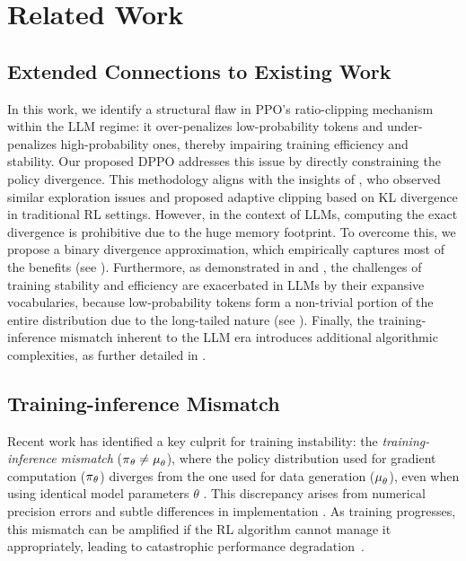 \section{Related Work}
\label{app:related_work}

\subsection{Extended Connections to Existing Work} \label{app:related_work_ratio_clipping}

In this work, we identify a structural flaw in PPO's ratio-clipping mechanism within the LLM regime: it over-penalizes low-probability tokens and under-penalizes high-probability ones, thereby impairing training efficiency and stability. Our proposed DPPO addresses this issue by directly constraining the policy divergence. 
This methodology aligns with the insights of \citet{wang2019trust, wang2020truly}, who observed similar exploration issues and proposed adaptive clipping based on KL divergence in traditional RL settings. However, in the context of LLMs, computing the exact divergence is prohibitive due to the huge memory footprint. To overcome this, we propose a binary divergence approximation, which empirically captures most of the benefits (see ). Furthermore, as demonstrated in  and , the challenges of training stability and efficiency are exacerbated in LLMs by their expansive vocabularies, because low-probability tokens form a non-trivial portion of the entire distribution due to the long-tailed nature (see ). Finally, the training-inference mismatch inherent to the LLM era introduces additional algorithmic complexities, as further detailed in .

\subsection{Training-inference Mismatch} \label{app:related_work_mismatch}
Recent work has identified a key culprit for training instability: the \textit{training-inference mismatch} (${\operatorname*{{\textcolor{black}{\pi}}}}_\theta \neq {\operatorname*{{\textcolor{black}{\mu}}}}_\theta$), where the policy distribution used for gradient computation ($\operatorname*{{\textcolor{black}{\pi}}}_\theta$) diverges from the one used for data generation ($\operatorname*{{\textcolor{black}{\mu}}}_\theta$), even when using identical model parameters $\theta$ \citep{yao2025offpolicy, qi2025defeating, liu-li-2025, zheng2025stabilizing}. This discrepancy arises from numerical precision errors \citep{qi2025defeating} and subtle differences in implementation \citep{Team2025EveryAM, he2025nondeterminism}. As training progresses, this mismatch can be amplified if the RL algorithm cannot manage it appropriately, leading to catastrophic performance degradation~\citep{qi2025defeating, liu-li-2025}.


